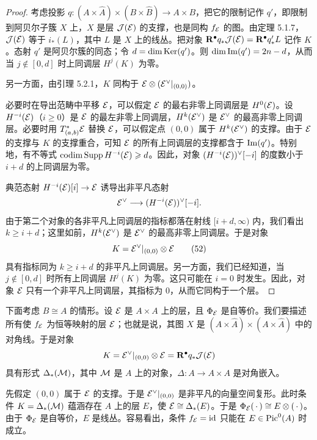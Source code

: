 \begin{proof}
考虑投影 $q:(A\times\hat A)\times(B\times\hat B)\to A\times B$，把它的限制记作 $q'$，即限制到阿贝尔子簇 $X$ 上，$X$ 是层 $\mathcal{J}(\mathcal{E})$ 的支撑，也是同构 $f_{\mathcal{E}}$ 的图。由定理 5.1.7，$\mathcal{J}(\mathcal{E})$ 等于 $i_*(L)$，其中 $L$ 是 $X$ 上的线丛。把对象 $\mathbf{R}^{\bullet} q_*\mathcal{J}(\mathcal{E})=\mathbf{R}^{\bullet} q'_*L$ 记作 $K$。态射 $q'$ 是阿贝尔簇的同态；令 $d=\dim\operatorname{Ker}(q')$。则 $\dim\operatorname{Im}(q')=2n-d$，从而当 $j\notin[0,d]$ 时上同调层 $H^j(K)$ 为零。

另一方面，由引理 5.2.1，$K$ 同构于 $\mathcal{E}\otimes(\mathcal{E}^\vee|_{(0,0)})$。

必要时在导出范畴中平移 $\mathcal{E}$，可以假定 $\mathcal{E}$ 的最右非零上同调层是 $H^0(\mathcal{E})$。设 $H^{-i}(\mathcal{E})$（$i\geqslant0$）是 $\mathcal{E}$ 的最左非零上同调层，$H^k(\mathcal{E}^\vee)$ 是 $\mathcal{E}^\vee$ 的最高非零上同调层。必要时用 $T^*_{(a,b)}\mathcal{E}$ 替换 $\mathcal{E}$，可以假定点 $(0,0)$ 属于 $H^k(\mathcal{E}^\vee)$ 的支撑。由于 $\mathcal{E}$ 的支撑与 $K$ 的支撑重合，可知 $\mathcal{E}$ 的所有上同调层的支撑都含于 $\operatorname{Im}(q')$。特别地，有不等式 $\operatorname{codim}\operatorname{Supp} H^{-i}(\mathcal{E})\geqslant d$。因此，对象 $(H^{-i}(\mathcal{E}))^\vee[-i]$ 的度数小于 $i+d$ 的上同调层为零。

典范态射 $H^{-i}(\mathcal{E})[i]\to\mathcal{E}$ 诱导出非平凡态射
\begin{equation*}
\mathcal{E}^\vee\longrightarrow(H^{-i}(\mathcal{E}))^\vee[-i].
\end{equation*}
由于第二个对象的各非平凡上同调层的指标都落在射线 $[i+d,\infty)$ 内，我们看出 $k\geqslant i+d$；这里如前，$H^k(\mathcal{E}^\vee)$ 是 $\mathcal{E}^\vee$ 的最高非零上同调层。于是对象
\begin{equation}
K=\mathcal{E}^\vee|_{(0,0)}\otimes\mathcal{E}\tag{52}
\end{equation}
具有指标同为 $k\geqslant i+d$ 的非平凡上同调层。另一方面，我们已经知道，当 $j\notin[0,d]$ 时所有上同调层 $H^j(K)$ 为零。这只可能在 $i=0$ 时发生。因此，对象 $\mathcal{E}$ 只有一个非平凡上同调层，其指标为 $0$，从而它同构于一个层。
\end{proof}

下面考虑 $B\cong A$ 的情形。设 $\mathcal{E}$ 是 $A\times A$ 上的层，且 $\Phi_{\mathcal{E}}$ 是自等价。我们要描述所有使 $f_{\mathcal{E}}$ 为恒等映射的层 $\mathcal{E}$；也就是说，其图 $X$ 是 $(A\times\hat A)\times(A\times\hat A)$ 中的对角线。于是对象
\begin{equation*}
K=\mathcal{E}^\vee|_{(0,0)}\otimes\mathcal{E}=\mathbf{R}^{\bullet} q_*\mathcal{J}(\mathcal{E})
\end{equation*}
具有形式 $\Delta_*(\mathcal{M})$，其中 $\mathcal{M}$ 是 $A$ 上的对象，$\Delta:A\to A\times A$ 是对角嵌入。

先假定 $(0,0)$ 属于 $\mathcal{E}$ 的支撑。于是 $\mathcal{E}^\vee|_{(0,0)}$ 是非平凡的向量空间复形。此时条件 $K=\Delta_*(\mathcal{M})$ 蕴涵存在 $A$ 上的层 $E$，使 $\mathcal{E}\cong\Delta_*(E)$。于是 $\Phi_{\mathcal{E}}(\,\cdot\,)\cong E\otimes(\,\cdot\,)$。由于 $\Phi_{\mathcal{E}}$ 是自等价，$E$ 是线丛。容易看出，条件 $f_{\mathcal{E}}=\mathrm{id}$ 只能在 $E\in\operatorname{Pic}^0(A)$ 时成立。

